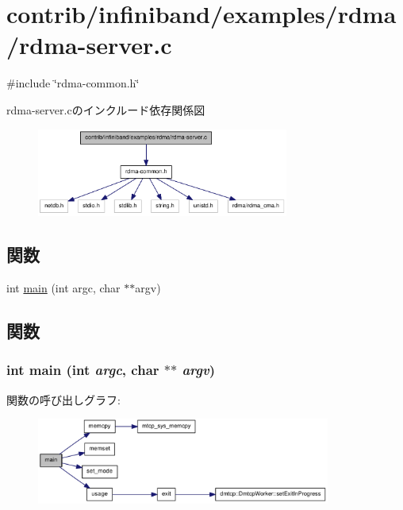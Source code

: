 \hypertarget{rdma-server_8c}{
\section{contrib/infiniband/examples/rdma/rdma-\/server.c}
\label{rdma-server_8c}
}
{\ttfamily \#include \char`\"{}rdma-\/common.h\char`\"{}}\par
rdma-\/server.cのインクルード依存関係図\nopagebreak
\begin{figure}[H]
\begin{center}
\leavevmode
\includegraphics[width=235pt]{rdma-server_8c__incl}
\end{center}
\end{figure}
\subsection*{関数}
\begin{DoxyCompactItemize}
\item 
int \hyperlink{rdma-server_8c_a3c04138a5bfe5d72780bb7e82a18e627}{main} (int argc, char $\ast$$\ast$argv)
\end{DoxyCompactItemize}


\subsection{関数}
\hypertarget{rdma-server_8c_a3c04138a5bfe5d72780bb7e82a18e627}{
\subsubsection[{main}]{\setlength{\rightskip}{0pt plus 5cm}int main (int {\em argc}, \/  char $\ast$$\ast$ {\em argv})}}
\label{rdma-server_8c_a3c04138a5bfe5d72780bb7e82a18e627}


関数の呼び出しグラフ:\nopagebreak
\begin{figure}[H]
\begin{center}
\leavevmode
\includegraphics[width=274pt]{rdma-server_8c_a3c04138a5bfe5d72780bb7e82a18e627_cgraph}
\end{center}
\end{figure}
